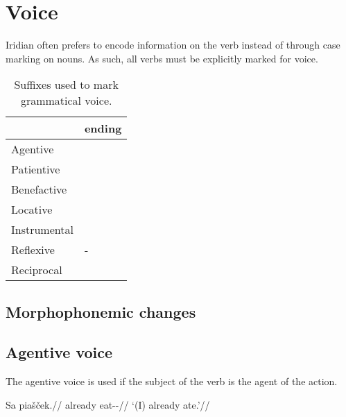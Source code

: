 \section{Voice}

Iridian often prefers to encode information on the verb instead of through case marking on nouns. As such, all verbs must be explicitly marked for voice.
\begin{table}[!ht]
	\small
	\caption{Suffixes used to mark grammatical voice.}\medskip
	\begin{tabu} to 0.5\textwidth{YY[0.5]}
		\toprule
		&{\sc ending}\\
		\midrule
		Agentive	& \\
		Patientive	& \\ 
		Benefactive	& \\ 
		Locative	& \\ 
		Instrumental& \\ 
		Reflexive	& -\\ 
		Reciprocal	& \\ 
		\bottomrule
	\end{tabu}
\end{table}

\subsection{Morphophonemic changes}


\subsection{Agentive voice}
\par The agentive voice is used if the subject of the verb is the agent of the action.

\pex
\begingl
\gla Sa piašček.//
\glb already eat-\Av{}-\Pf{}//
\glft `(I) already ate.'//
\endgl
\xe

